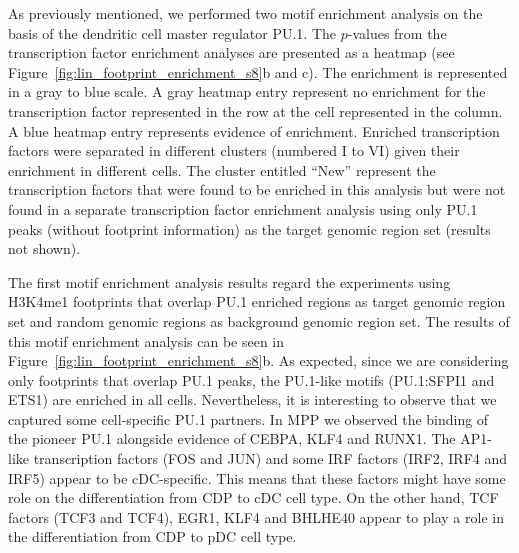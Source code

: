 As previously mentioned, we performed two motif enrichment analysis on the basis of the dendritic cell master regulator PU.1. The $p$-values from the transcription factor enrichment analyses are presented as a heatmap (see Figure~\ref{fig:lin_footprint_enrichment_s8}b and c). The enrichment is represented in a gray to blue scale. A gray heatmap entry represent no enrichment for the transcription factor represented in the row at the cell represented in the column. A blue heatmap entry represents evidence of enrichment. Enriched transcription factors were separated in different clusters (numbered I to VI) given their enrichment in different cells. The cluster entitled ``New'' represent the transcription factors that were found to be enriched in this analysis but were not found in a separate transcription factor enrichment analysis using only PU.1 peaks (without footprint information) as the target genomic region set (results not shown).

The first motif enrichment analysis results regard the experiments using H3K4me1 footprints that overlap PU.1 enriched regions as target genomic region set and random genomic regions as background genomic region set. The results of this motif enrichment analysis can be seen in Figure~\ref{fig:lin_footprint_enrichment_s8}b. As expected, since we are considering only footprints that overlap PU.1 peaks, the PU.1-like motifs (PU.1:SFPI1 and ETS1) are enriched in all cells. Nevertheless, it is interesting to observe that we captured some cell-specific PU.1 partners. In MPP we observed the binding of the pioneer PU.1 alongside evidence of CEBPA, KLF4 and RUNX1. The AP1-like transcription factors (FOS and JUN) and some IRF factors (IRF2, IRF4 and IRF5) appear to be cDC-specific. This means that these factors might have some role on the differentiation from CDP to cDC cell type. On the other hand, TCF factors (TCF3 and TCF4), EGR1, KLF4 and BHLHE40 appear to play a role in the differentiation from CDP to pDC cell type.

